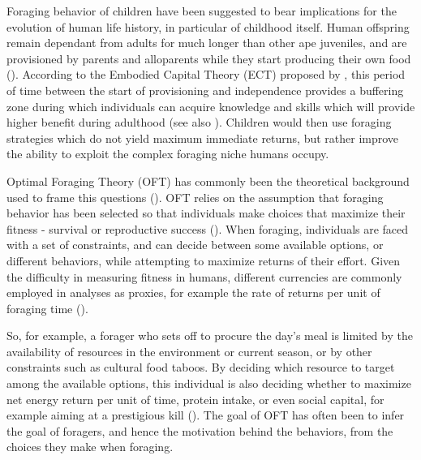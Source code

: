 Foraging behavior of children have been suggested to bear implications for the evolution of human life history, in particular of childhood itself. Human offspring remain dependant from adults for much longer than other ape juveniles, and are provisioned by parents and alloparents while they start producing their own food (\cite{hrdy_evolutionary_2006, crittenden_allomaternal_2008}).%
According to the Embodied Capital Theory (ECT) proposed by \cite{kaplan_theory_2000}, this period of time between the start of provisioning and independence provides a buffering zone during which individuals can acquire knowledge and skills which will provide higher benefit during adulthood (see also \cite{kaplan_embodied_2001, kaplan_embodied_2003, kaplan_neural_2003, kaplan_evolution_2007, kaplan_theory_1996, kaplan_evolution_1997, kaplan_life_2006, kaplan_emergence_2002}). Children would then use foraging strategies which do not yield maximum immediate returns, but rather improve the ability to exploit the complex foraging niche humans occupy. 

Optimal Foraging Theory (OFT) has commonly been the theoretical background used to frame this questions (\cite{winterhalder_hunter-gatherer_1981, smith_anthropological_1983}). OFT relies on the assumption that foraging behavior has been selected so that individuals make choices that maximize their fitness - survival or reproductive success (\cite{pyke_optimal_1977}). When foraging, individuals are faced with a set of constraints, and can decide between some available options, or different behaviors, while attempting to maximize returns of their effort. Given the difficulty in measuring fitness in humans, different currencies are commonly employed in analyses as proxies, for example the rate of returns per unit of foraging time (\cite{smith_anthropological_1983}).

So, for example, a forager who sets off to procure the day's meal is limited by the availability of resources in the environment or current season, or by other constraints such as cultural food taboos. By deciding which resource to target among the available options, this individual is also deciding whether to maximize net energy return per unit of time, protein intake, or even social capital, for example aiming at a prestigious kill (\cite{hawkes_foraging_1996}). The goal of OFT has often been to infer the goal of foragers, and hence the motivation behind the behaviors, from the choices they make when foraging. 

